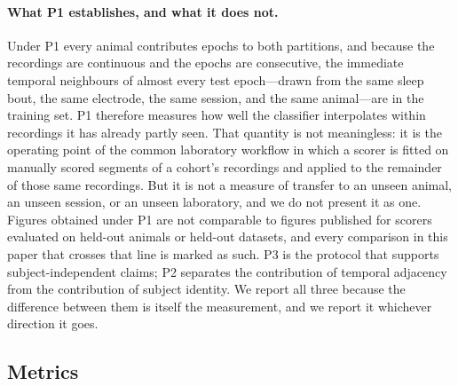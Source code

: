 \paragraph{What P1 establishes, and what it does not.}
Under P1 every animal contributes epochs to both partitions, and because
the recordings are continuous and the epochs are consecutive, the
immediate temporal neighbours of almost every test epoch---drawn from the
same sleep bout, the same electrode, the same session, and the same
animal---are in the training set. P1 therefore measures how well the
classifier interpolates within recordings it has already partly seen.
That quantity is not meaningless: it is the operating point of the common
laboratory workflow in which a scorer is fitted on manually scored
segments of a cohort's recordings and applied to the remainder of those
same recordings. But it is not a measure of transfer to an unseen animal,
an unseen session, or an unseen laboratory, and we do not present it as
one. Figures obtained under P1 are not comparable to figures published
for scorers evaluated on held-out animals or held-out datasets, and every
comparison in this paper that crosses that line is marked as such.
P3 is the protocol that supports subject-independent claims; P2 separates
the contribution of temporal adjacency from the contribution of subject
identity. We report all three because the difference between them is
itself the measurement, and we report it whichever direction it goes.


\subsection{Metrics}
\label{subsec:metrics}

